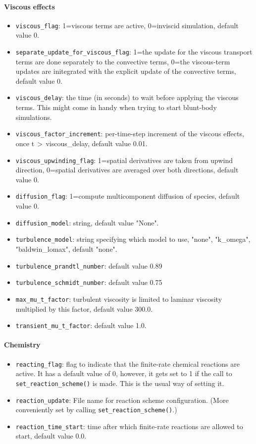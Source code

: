 \paragraph{Viscous effects}
\begin{itemize}
\item \texttt{viscous\_flag}: 1=viscous terms are active, 0=inviscid
  simulation, default value 0.
\item \texttt{separate\_update\_for\_viscous\_flag}\ddag: 1=the update 
  for the viscous transport terms are done separately to the convective terms,
  0=the viscous-term updates are initegrated with the explicit update of the convective terms,
  default value 0.
\item \texttt{viscous\_delay}: the time (in seconds) to wait before applying
  the viscous terms.
  This might come in handy when trying to start blunt-body simulations.
\item \texttt{viscous\_factor\_increment}: per-time-step increment of the viscous effects, once
  t\,$>$\,viscous\_delay, default value 0.01.
\item \texttt{viscous\_upwinding\_flag}: 1=spatial derivatives are taken from upwind direction, 0=spatial derivatives are averaged over both directions, default value 0.
\item \texttt{diffusion\_flag}: 1=compute multicomponent diffusion of species, default value 0.
\item \texttt{diffusion\_model}: string, default value "None".
\item \texttt{turbulence\_model}: string specifying which model to use, "none", "k\_omega", "baldwin\_lomax",
  default "none".
\item \texttt{turbulence\_prandtl\_number}: default value 0.89
\item \texttt{turbulence\_schmidt\_number}: default value 0.75
\item \texttt{max\_mu\_t\_factor}: turbulent viscosity is limited to laminar viscosity multiplied
  by this factor, default value 300.0. 
\item \texttt{transient\_mu\_t\_factor}: default value 1.0.
\end{itemize}

\paragraph{Chemistry}
\begin{itemize}
\item \texttt{reacting\_flag}: flag to indicate that the finite-rate chemical
  reactions are active.
  It has a default value of 0, however, it gets set to 1 if the call 
  to \texttt{set\_reaction\_scheme()} is made.
  This is the usual way of setting it.
\item \texttt{reaction\_update}: File name for reaction scheme configuration.
  (More conveniently set by calling \texttt{set\_reaction\_scheme()}.)
\item \texttt{reaction\_time\_start}: time after which finite-rate reactions are allowed to start,
  default value 0.0.
\end{itemize}

